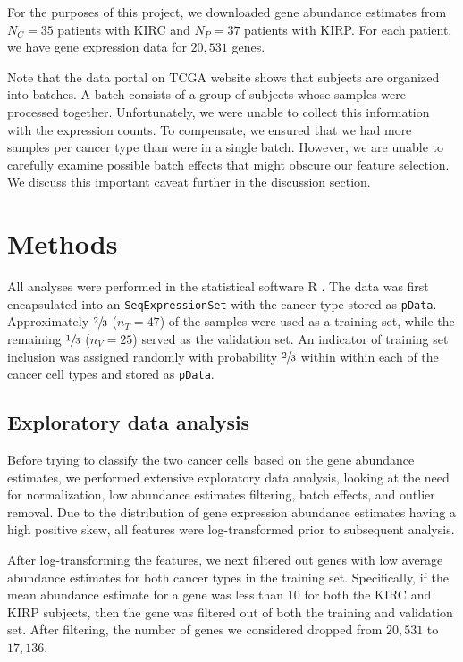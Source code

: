 For the purposes of this project, we downloaded gene abundance estimates from
$N_C =35$ patients with KIRC and $N_P = 37$ patients with KIRP.  For each
patient, we have gene expression data for $20,531$ genes. 

Note that the data portal on TCGA website shows that subjects are organized
into batches.  A batch consists of a group of subjects whose samples were
processed together.  Unfortunately, we were unable to collect this information
with the expression counts. To compensate, we ensured that we had more samples
per cancer type than were in a single batch.  However, we are unable to
carefully examine possible batch effects that might obscure our feature
selection.  We discuss this important caveat further in the discussion
section.

\section{Methods}

All analyses were performed in the statistical software R \cite{rmanual}. The
data was first encapsulated into an \texttt{SeqExpressionSet} \cite{biobase}
with the cancer type stored as \texttt{pData}.
Approximately $\sfrac{2}{3}$ ($n_T = 47$) of the samples were used as a
training set, while the remaining $\sfrac{1}{3}$ ($n_V = 25$) served as the
validation set. An indicator of training set inclusion was assigned randomly
with probability $\sfrac{2}{3}$ within within each of the cancer cell types
and stored as \texttt{pData}.

\subsection*{Exploratory data analysis}

Before trying to classify the two cancer cells based on the gene abundance
estimates, we performed extensive exploratory data analysis, looking at the
need for normalization, low abundance estimates filtering, batch effects, and
outlier removal.  Due to the distribution of gene expression abundance
estimates having a high positive skew, all features were log-transformed prior
to subsequent analysis.

After log-transforming the features, we next filtered out genes with low
average abundance estimates for both cancer types in the training set.
Specifically, if the mean abundance estimate for a gene was less than 10 for
both the KIRC and KIRP subjects, then the gene was filtered out of both the
training and validation set. After filtering, the number of genes we considered
dropped from $20,531$ to $17,136$.

